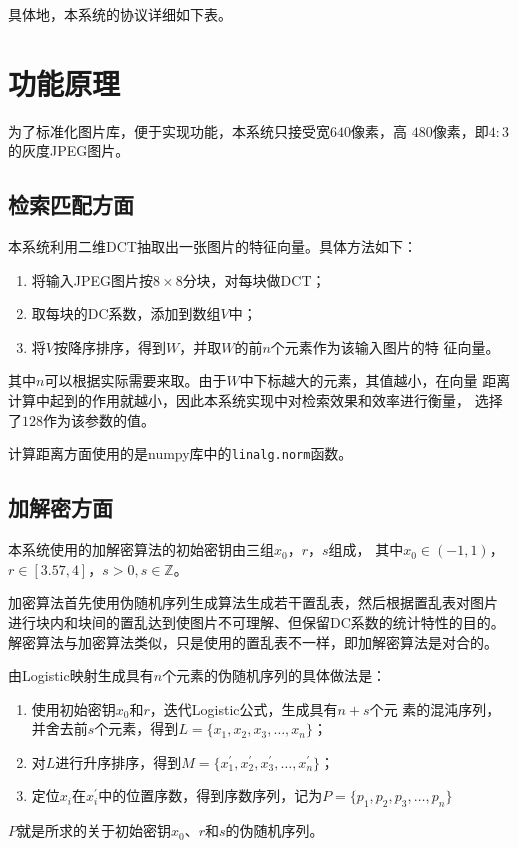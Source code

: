 具体地，本系统的协议详细如下表。


\section{功能原理}
\label{sec:func-impl}

为了标准化图片库，便于实现功能，本系统只接受宽$640$像素，高
$480$像素，即$4:3$的灰度JPEG图片。

\subsection{检索匹配方面}
\label{sec:retrieval-impl}
本系统利用二维DCT抽取出一张图片的特征向量。具体方法如下：
\begin{enumerate}
\item 将输入JPEG图片按$8 \times 8$分块，对每块做DCT；
\item 取每块的DC系数，添加到数组$V$中；
\item 将$V$按降序排序，得到$W$，并取$W$的前$n$个元素作为该输入图片的特
  征向量。
\end{enumerate}

其中$n$可以根据实际需要来取。由于$W$中下标越大的元素，其值越小，在向量
距离计算中起到的作用就越小，因此本系统实现中对检索效果和效率进行衡量，
选择了$128$作为该参数的值。

计算距离方面使用的是numpy库中的\texttt{linalg.norm}函数。

\subsection{加解密方面}
\label{sec:enc-dec-impl}
本系统使用的加解密算法的初始密钥由三组$x_0$，$r$，$s$组成，
其中$x_0 \in (-1, 1)$，$r \in [3.57, 4]$，$s > 0, s \in \mathbb{Z}$。

加密算法首先使用伪随机序列生成算法生成若干置乱表，然后根据置乱表对图片
进行块内和块间的置乱达到使图片不可理解、但保留DC系数的统计特性的目的。
解密算法与加密算法类似，只是使用的置乱表不一样，即加解密算法是对合的。

由Logistic映射生成具有$n$个元素的伪随机序列的具体做法\cite{lu2007}是：
\begin{enumerate}
  \item 使用初始密钥$x_0$和$r$，迭代Logistic公式，生成具有$n + s$个元
      素的混沌序列，并舍去前$s$个元素，得到$L = \{x_1, x_2, x_3, \dotsc, x_n\}$；
  \item 对$L$进行升序排序，得到$M = \{x_1^\prime, x_2^\prime, x_3^\prime,
      \dotsc, x_n^\prime\}$；
  \item 定位$x_i$在$x_i^\prime$中的位置序数，得到序数序列，记为$P =
      \{p_1, p_2, p_3, \dotsc, p_n\}$
\end{enumerate}
$P$就是所求的关于初始密钥$x_0$、$r$和$s$的伪随机序列。

